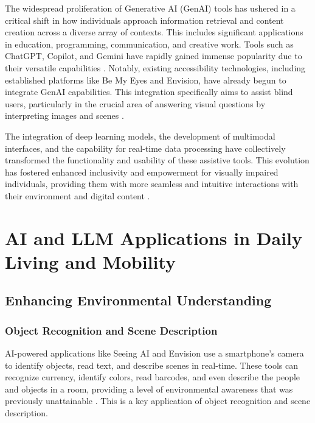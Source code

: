 The widespread proliferation of Generative AI (GenAI) tools has ushered in a critical shift in how individuals approach information retrieval and content creation across a diverse array of contexts. This includes significant applications in education, programming, communication, and creative work. Tools such as ChatGPT, Copilot, and Gemini have rapidly gained immense popularity due to their versatile capabilities \supercite{maitraye2024}. Notably, existing accessibility technologies, including established platforms like Be My Eyes and Envision, have already begun to integrate GenAI capabilities. This integration specifically aims to assist blind users, particularly in the crucial area of answering visual questions by interpreting images and scenes \supercite{maitraye2024}.

The integration of deep learning models, the development of multimodal interfaces, and the capability for real-time data processing have collectively transformed the functionality and usability of these assistive tools. This evolution has fostered enhanced inclusivity and empowerment for visually impaired individuals, providing them with more seamless and intuitive interactions with their environment and digital content \supercite{arxiv2503}.

\section{AI and LLM Applications in Daily Living and Mobility}\label{ch9:sec:daily-living}

\subsection{Enhancing Environmental Understanding}\label{ch9:ssec:environmental-understanding}

\subsubsection{Object Recognition and Scene Description}\label{ch9:sssec:object-recognition}
AI-powered applications like Seeing AI and Envision use a smartphone's camera to identify objects, read text, and describe scenes in real-time. These tools can recognize currency, identify colors, read barcodes, and even describe the people and objects in a room, providing a level of environmental awareness that was previously unattainable \supercite{SeeingAI, msseeingai, envision}. This is a key application of object recognition and scene description.

